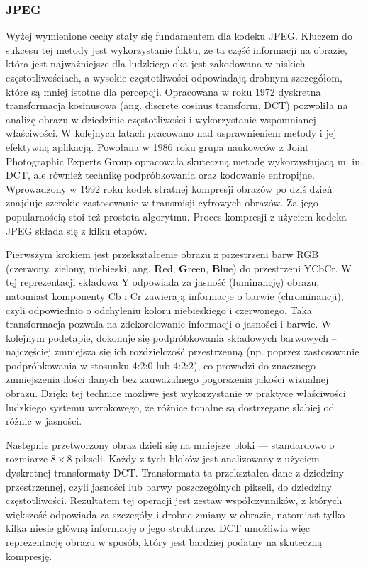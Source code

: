 \subsubsection{JPEG}
Wyżej wymienione cechy stały się fundamentem dla kodeku JPEG. Kluczem do sukcesu tej metody jest wykorzystanie faktu, że ta część informacji na obrazie, która jest najważniejsze dla ludzkiego oka jest zakodowana w niskich częstotliwościach, a wysokie częstotliwości odpowiadają drobnym szczegółom, które są mniej istotne dla percepcji. Opracowana w roku 1972 dyskretna transformacja kosinusowa (ang. discrete cosinus transform, DCT) pozwoliła na analizę obrazu w dziedzinie częstotliwości i wykorzystanie wspomnianej właściwości. W kolejnych latach pracowano nad usprawnieniem metody i jej efektywną aplikacją. Powołana w 1986 roku grupa naukowców z Joint Photographic Experts Group opracowała skuteczną metodę wykorzystującą m. in. DCT, ale również technikę podpróbkowania oraz kodowanie entropijne. Wprowadzony w 1992 roku kodek stratnej kompresji obrazów po dziś dzień znajduje szerokie zastosowanie w transmisji cyfrowych obrazów. Za jego popularnością stoi też prostota algorytmu. Proces kompresji z użyciem kodeka JPEG składa się z kilku etapów.

Pierwszym krokiem jest przekształcenie obrazu z przestrzeni barw RGB (czerwony, zielony, niebieski, ang. \textbf{R}ed, \textbf{G}reen, \textbf{B}lue) do przestrzeni YCbCr. W tej reprezentacji składowa Y odpowiada za jasność (luminancję) obrazu, natomiast komponenty Cb i Cr zawierają informacje o barwie (chrominancji), czyli odpowiednio o odchyleniu koloru niebieskiego i czerwonego. Taka transformacja pozwala na zdekorelowanie informacji o jasności i barwie. W kolejnym podetapie, dokonuje się podpróbkowania składowych barwowych – najczęściej zmniejsza się ich rozdzielczość przestrzenną (np. poprzez zastosowanie podpróbkowania w stosunku 4:2:0 lub 4:2:2), co prowadzi do znacznego zmniejszenia ilości danych bez zauważalnego pogorszenia jakości wizualnej obrazu. Dzięki tej technice możliwe jest wykorzystanie w praktyce właściwości ludzkiego systemu wzrokowego, że różnice tonalne są dostrzegane słabiej od różnic w jasności.

Następnie przetworzony obraz dzieli się na mniejsze bloki --- standardowo o rozmiarze \(8\times8\) pikseli. Każdy z tych bloków jest analizowany z użyciem dyskretnej transformaty DCT. Transformata ta przekształca dane z dziedziny przestrzennej, czyli jasności lub barwy poszczególnych pikseli, do dziedziny częstotliwości. Rezultatem tej operacji jest zestaw współczynników, z których większość odpowiada za szczegóły i drobne zmiany w obrazie, natomiast tylko kilka niesie główną informację o jego strukturze. DCT umożliwia więc reprezentację obrazu w sposób, który jest bardziej podatny na skuteczną kompresję.

